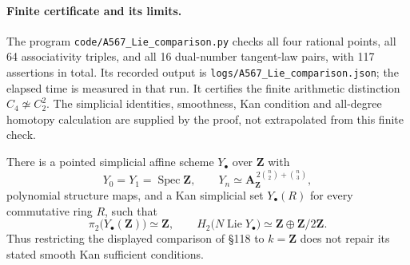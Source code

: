 \paragraph{Finite certificate and its limits.}
The program \texttt{code/A567\_Lie\_comparison.py} checks all four rational
points, all 64 associativity triples, and all 16 dual-number tangent-law
pairs, with 117 assertions in total.  Its recorded output is
\texttt{logs/A567\_Lie\_comparison.json}; the elapsed time is measured in
that run.  It certifies the finite arithmetic distinction
\(C_4\not\simeq C_2^2\).  The simplicial identities, smoothness, Kan
condition and all-degree homotopy calculation are supplied by the proof,
not extrapolated from this finite check.

\begin{proposition}\label{B:Lie-comparison-integral-counterexample}
There is a pointed simplicial affine scheme \(Y_\bullet\) over
\(\mathbf Z\) with
\[
 Y_0=Y_1=\operatorname{Spec}\mathbf Z,
 \qquad
 Y_n\simeq\mathbf A_{\mathbf Z}^{\,2\binom n2+\binom n3},
\]
polynomial structure maps, and a Kan simplicial set \(Y_\bullet(R)\) for
every commutative ring \(R\), such that
\[
 \pi_2\bigl(Y_\bullet(\mathbf Z)\bigr)\simeq\mathbf Z,
 \qquad
 H_2\bigl(N\operatorname{Lie}Y_\bullet\bigr)
       \simeq\mathbf Z\oplus\mathbf Z/2\mathbf Z.
\]
Thus restricting the displayed comparison of \S118 to \(k=\mathbf Z\)
does not repair its stated smooth Kan sufficient conditions.
\end{proposition}

